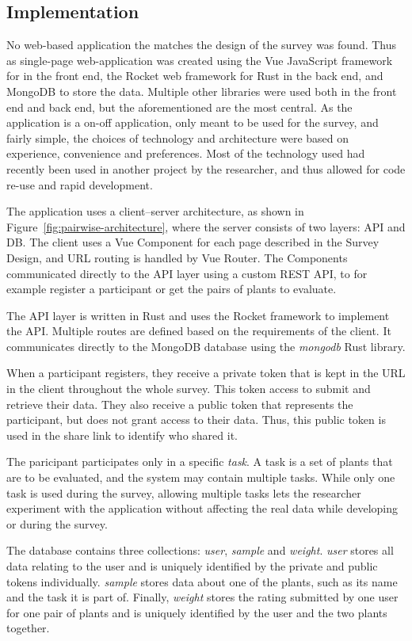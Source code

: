 \subsection{Implementation}
No web-based application the matches the design of the survey was found.
Thus as single-page web-application was created using the Vue JavaScript framework for in the front end, the Rocket web framework for Rust in the back end, and MongoDB to store the data.
Multiple other libraries were used both in the front end and back end, but the aforementioned are the most central.
As the application is a on-off application, only meant to be used for the survey, and fairly simple, the choices of technology and architecture were based on experience, convenience and preferences.
Most of the technology used had recently been used in another project by the researcher, and thus allowed for code re-use and rapid development.

The application uses a client--server architecture, as shown in Figure~\ref{fig:pairwise-architecture}, where the server consists of two layers: API and DB.
The client uses a Vue Component for each page described in the Survey Design, and URL routing is handled by Vue Router.
The Components communicated directly to the API layer using a custom REST API, to for example register a participant or get the pairs of plants to evaluate.

The API layer is written in Rust and uses the Rocket framework to implement the API.
Multiple routes are defined based on the requirements of the client.
It communicates directly to the MongoDB database using the \textit{mongodb} Rust library.

When a participant registers, they receive a private token that is kept in the URL in the client throughout the whole survey.
This token access to submit and retrieve their data.
They also receive a public token that represents the participant, but does not grant access to their data.
Thus, this public token is used in the share link to identify who shared it.

The paricipant participates only in a specific \textit{task}.
A task is a set of plants that are to be evaluated, and the system may contain multiple tasks.
While only one task is used during the survey, allowing multiple tasks lets the researcher experiment with the application without affecting the real data while developing or during the survey.

The database contains three collections: \textit{user}, \textit{sample} and \textit{weight}.
\textit{user} stores all data relating to the user and is uniquely identified by the private and public tokens individually.
\textit{sample} stores data about one of the plants, such as its name and the task it is part of.
Finally, \textit{weight} stores the rating submitted by one user for one pair of plants and is uniquely identified by the user and the two plants together.

